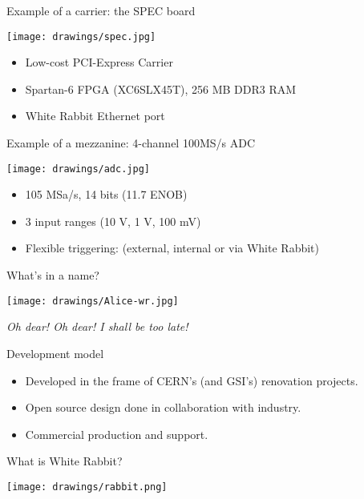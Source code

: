 \documentclass[compress,red]{beamer}
\begin{document}
\begin{frame}{Example of a carrier: the SPEC board}
\begin{center}
\texttt{[image: drawings/spec.jpg]}
\begin{itemize}
\item Low-cost PCI-Express Carrier
\item Spartan-6 FPGA (XC6SLX45T), 256 MB DDR3 RAM
\item White Rabbit Ethernet port
\end{itemize}
\end{center}
\end{frame}

\begin{frame}{Example of a mezzanine: 4-channel 100MS/s ADC}
\begin{center}
\texttt{[image: drawings/adc.jpg]}
\begin{itemize}
\item 105 MSa/s, 14 bits (11.7 ENOB)
\item 3 input ranges (10 V, 1 V, 100 mV)
\item Flexible triggering: (external, internal or via White Rabbit)
\end{itemize}
\end{center}
\end{frame}

\begin{frame}{What's in a name?}
\begin{center}
\texttt{[image: drawings/Alice-wr.jpg]}

\textit{Oh dear! Oh dear! I shall be too late!}\\
\end{center}
\end{frame}

\begin{frame}{Development model}
\begin{itemize}
\item Developed in the frame of CERN's (and GSI's) renovation projects.
\item Open source design done in collaboration with industry.
\item Commercial production and support.
\end{itemize}
\end{frame}

\begin{frame}{What is White Rabbit?}
\begin{center}
\texttt{[image: drawings/rabbit.png]}
\end{center}
\end{frame}
\end{document}
